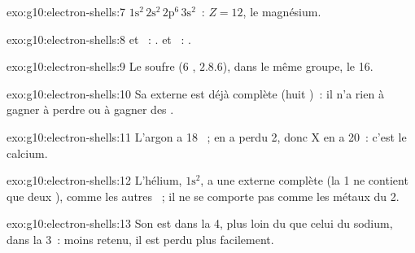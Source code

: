 \begin{solution}{exo:g10:electron-shells:7}
$1\mathrm{s}^2\,2\mathrm{s}^2\,2\mathrm{p}^6\,3\mathrm{s}^2$~: $Z = 12$,
le magnésium.
\end{solution}

\begin{solution}{exo:g10:electron-shells:8}
 et ~: .  et ~:
.
\end{solution}

\begin{solution}{exo:g10:electron-shells:9}
Le soufre (6 , $2.8.6$), dans le même groupe, le 16.
\end{solution}

\begin{solution}{exo:g10:electron-shells:10}
Sa  externe est déjà complète (huit )~: il n'a rien à
gagner à perdre ou à gagner des .
\end{solution}

\begin{solution}{exo:g10:electron-shells:11}
L'argon a 18 ~;  en a perdu 2, donc X en a 20~: c'est
le calcium.
\end{solution}

\begin{solution}{exo:g10:electron-shells:12}
L'hélium, $1\mathrm{s}^2$, a une  externe complète (la  1
ne contient que deux ), comme les autres ~; il ne se
comporte pas comme les métaux du  2.
\end{solution}

\begin{solution}{exo:g10:electron-shells:13}
Son  est dans la  4, plus loin du  que
celui du sodium, dans la  3~: moins retenu, il est perdu plus
facilement.
\end{solution}

